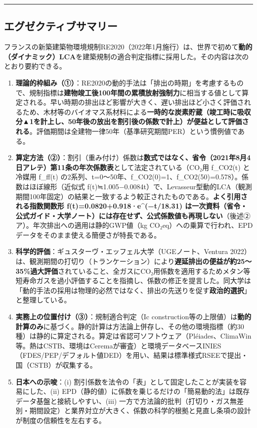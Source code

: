 \begin{center}\rule{0.5\linewidth}{0.5pt}\end{center}

\hypertarget{ux30a8ux30b0ux30bcux30afux30c6ux30a3ux30d6ux30b5ux30deux30eaux30fc}{%
\subsection{エグゼクティブサマリー}\label{ux30a8ux30b0ux30bcux30afux30c6ux30a3ux30d6ux30b5ux30deux30eaux30fc}}

フランスの新築建築物環境規制RE2020（2022年1月施行）は、世界で初めて\textbf{動的（ダイナミック）LCA}を建築規制の適合判定指標に採用した。その内容は次のとおり要約できる。

\begin{enumerate}
\def\labelenumi{\arabic{enumi}.}
\tightlist
\item
  \textbf{理論的枠組み（①）}：RE2020の動的手法は「排出の時期」を考慮するもので、規制指標は\textbf{建物竣工後100年間の累積放射強制力}に相当する値として算定される。早い時期の排出ほど影響が大きく、遅い排出ほど小さく評価されるため、木材等のバイオマス系材料による\textbf{一時的な炭素貯蔵（竣工時に吸収分▲1を計上し、50年後の放出を割引後の係数で計上）が便益として評価される}。評価期間は全建物一律50年（基準研究期間PER）という慣例値である。
\item
  \textbf{算定方法（②）}：割引（重み付け）係数は\textbf{数式ではなく、省令（2021年8月4日アレテ）第11条の年次係数表}として法定されている（CO₂用
  f\_CO2(t) と冷媒用 f\_ff(t)
  の2系列、t=0〜50年、f\_CO2(0)=1、f\_CO2(50)=0.578）。係数はほぼ線形（近似式
  f(t)≒1.005−0.0084t）で、Levasseur型動的LCA（観測期間100年固定）の結果と一致するよう較正されたものである。\textbf{よく引用される指数関数形
  f(t)=0.0820+0.918·e\^{}(−t/18.31)
  は一次資料（省令・公式ガイド・大学ノート）には存在せず、公式係数値も再現しない}（後述②ア）。年次排出への適用は静的GWP値（kg
  CO₂eq）への乗算で行われ、EPDデータをそのまま使える簡便さが特長である。
\item
  \textbf{科学的評価}：ギュスターヴ・エッフェル大学（UGEノート、Ventura
  2022）は、観測期間の打切り（トランケーション）により\textbf{遅延排出の便益が約25〜35\%過大評価}されていること、全ガスにCO₂用係数を適用するためメタン等短寿命ガスを過小評価することを指摘し、係数の修正を提言した。同大学は「動的手法の採用は物理的必然ではなく、排出の先送りを促す\textbf{政治的選択}」と整理している。
\item
  \textbf{実務上の位置付け（③）}：規制適合判定（Ic
  construction等の上限値）は\textbf{動的計算のみ}に基づく。静的計算は方法論上併存し、その他の環境指標（約30種）は静的に算定される。算定は省認可ソフトウェア（Pléiades、ClimaWin等。熱はCSTB、環境はCeremaが審査）と環境データベースINIES（FDES/PEP/デフォルト値DED）を用い、結果は標準様式RSEEで提出・国（CSTB）が収集する。
\item
  \textbf{日本への示唆}：(i)
  割引係数を法令の「表」として固定したことが実装を容易にした、(ii)
  EPD（静的値）に係数を乗じるだけの「簡易動的法」は既存データ基盤と接続しやすい、(iii)
  一方で方法論的批判（打切り・ガス無差別・期間設定）と業界対立が大きく、係数の科学的根拠と見直し条項の設計が制度の信頼性を左右する。
\end{enumerate}

